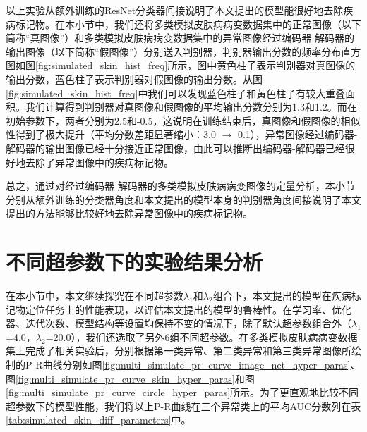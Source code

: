 以上实验从额外训练的ResNet分类器间接说明了本文提出的模型能很好地去除疾病标记物。在本小节中，我们还将多类模拟皮肤病病变数据集中的正常图像（以下简称“真图像”）和多类模拟皮肤病病变数据集中的异常图像经过编码器-解码器的输出图像（以下简称“假图像”）分别送入判别器，判别器输出分数的频率分布直方图如图\ref{fig:simulated_skin_hist_freq}所示，图中黄色柱子表示判别器对真图像的输出分数，蓝色柱子表示判别器对假图像的输出分数。从图\ref{fig:simulated_skin_hist_freq}中我们可以发现蓝色柱子和黄色柱子有较大重叠面积。我们计算得到判别器对真图像和假图像的平均输出分数分别为1.3和1.2。而在初始参数下，两者分别为2.5和-0.5，这说明在训练结束后，真图像和假图像的相似性得到了极大提升（平均分数差距显著缩小：3.0 $\rightarrow$ 0.1），异常图像经过编码器-解码器的输出图像已经十分接近正常图像，由此可以推断出编码器-解码器已经很好地去除了异常图像中的疾病标记物。

总之，通过对经过编码器-解码器的多类模拟皮肤病病变图像的定量分析，本小节分别从额外训练的分类器角度和本文提出的模型本身的判别器角度间接说明了本文提出的方法能够比较好地去除异常图像中的疾病标记物。
\section{不同超参数下的实验结果分析}\label{sec:multi_classes_hyper_paras}
在本小节中，本文继续探究在不同超参数$\lambda_{1}$和$\lambda_{2}$组合下，本文提出的模型在疾病标记物定位任务上的性能表现，以评估本文提出的模型的鲁棒性。在学习率、优化器、迭代次数、模型结构等设置均保持不变的情况下，除了默认超参数组合外（$\lambda_{1}$=4.0，$\lambda_{2}$=20.0），我们还选取了另外6组不同超参数。在多类模拟皮肤病病变数据集上完成了相关实验后，分别根据第一类异常、第二类异常和第三类异常图像所绘制的P-R曲线分别如图\ref{fig:multi_simulate_pr_curve_image_net_hyper_paras}、图\ref{fig:multi_simulate_pr_curve_skin_hyper_paras}和图\ref{fig:multi_simulate_pr_curve_circle_hyper_paras}所示。为了更直观地比较不同超参数下的模型性能，我们将以上P-R曲线在三个异常类上的平均AUC分数列在表\ref{tab:simulated_skin_diff_parameters}中。

